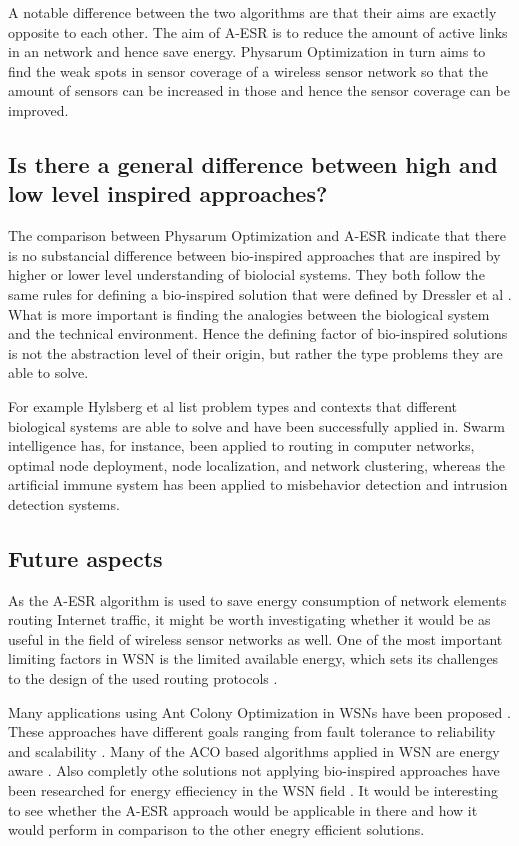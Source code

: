 \documentclass[cameraready]{IWORK2014}
\begin{document}
A notable difference between the two algorithms are that their aims are exactly opposite to each other. The aim of A-ESR is to reduce the amount of active links in an network and hence save energy. Physarum Optimization in turn aims to find the weak spots in sensor coverage of a wireless sensor network so that the amount of sensors can be increased in those and hence the sensor coverage can be improved.

\subsection{Is there a general difference between high and low level inspired approaches?}
The comparison between Physarum Optimization and A-ESR indicate that there is no substancial difference between bio-inspired approaches that are inspired by higher or lower level understanding of biolocial systems. They both follow the same rules for defining a bio-inspired solution that were defined by Dressler et al \cite{dressler2010bio}. What is more important is finding the analogies between the biological system and the technical environment. Hence the defining factor of bio-inspired solutions is not the abstraction level of their origin, but rather the type problems they are able to solve.

For example Hylsberg et al \cite{hylsberg2011bioinspired} list problem types and contexts that different biological systems are able to solve and have been successfully applied in. Swarm intelligence has, for instance, been applied to routing in computer networks, optimal node deployment, node localization, and network clustering, whereas the artificial immune system has been applied to misbehavior detection and intrusion detection systems.

\subsection{Future aspects}
As the A-ESR algorithm is used to save energy consumption of network elements routing Internet traffic, it might be worth investigating whether it would be as useful in the field of wireless sensor networks as well. One of the most important limiting factors in WSN is the limited available energy, which sets its challenges to the design of the used routing protocols \cite{hylsberg2011bioinspired}.

Many applications using Ant Colony Optimization in WSNs have been proposed \cite{bennis2013enhanced, zhang2004improvements, camilo2006energy, cai2006aco, sun2008asar, kiri2007self, ghasemaghaei2007ant}. These approaches have different goals ranging from fault tolerance \cite{zhang2004improvements} to reliability and scalability \cite{kiri2007self}. Many of the ACO based algorithms applied in WSN are energy aware \cite{saleem2011swarm}. Also completly othe solutions not applying bio-inspired approaches have been researched for energy effieciency in the WSN field \cite{wightman2008a3}. It would be interesting to see whether the A-ESR approach would be applicable in there and how it would perform in comparison to the other enegry efficient solutions.
\end{document}
